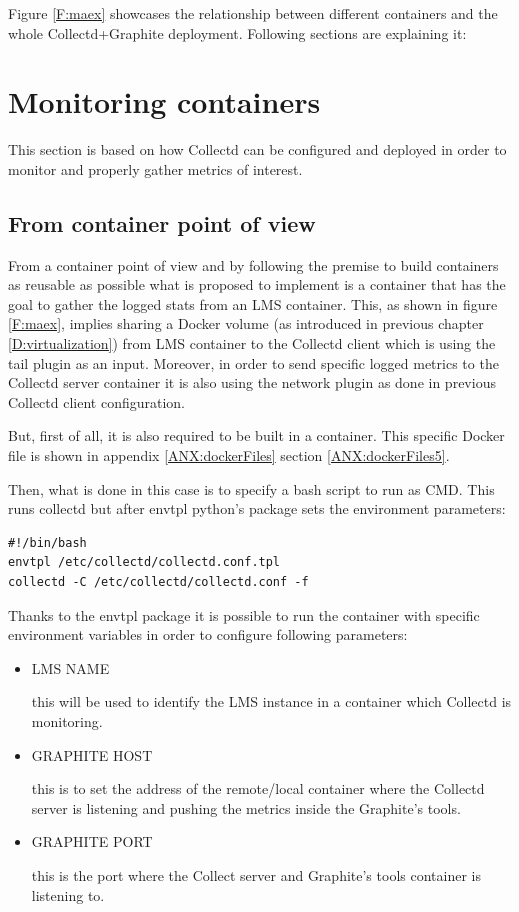 Figure \ref{F:maex} showcases the relationship between different containers and the whole Collectd+Graphite deployment. Following sections are explaining it:

\section{Monitoring containers}

This section is based on how Collectd can be configured and deployed in order to monitor and properly gather metrics of interest.

\subsection{From container point of view}

From a container point of view and by following the premise to build containers as reusable as possible what is proposed to implement is a container that has the goal to gather the logged stats from an LMS container. This, as shown in figure \ref{F:maex}, implies sharing a Docker volume (as introduced in previous chapter \ref{D:virtualization}) from LMS container to the Collectd client which is using the tail plugin as an input. Moreover, in order to send specific logged metrics to the Collectd server container it is also using the network plugin as done in previous Collectd client configuration.

But, first of all, it is also required to be built in a container. This specific Docker file is shown in appendix \ref{ANX:dockerFiles} section \ref{ANX:dockerFiles5}.

Then, what is done in this case is to specify a bash script to run as CMD. This runs collectd but after envtpl python's package sets the environment parameters:
\begin{verbatim}
#!/bin/bash
envtpl /etc/collectd/collectd.conf.tpl
collectd -C /etc/collectd/collectd.conf -f
\end{verbatim}

Thanks to the envtpl package it is possible to run the container with specific environment variables in order to configure following parameters:

\begin{itemize}
\item LMS NAME \hfill

this will be used to identify the LMS instance in a container which Collectd is monitoring.
\item GRAPHITE HOST \hfill

this is to set the address of the remote/local container where the Collectd server is listening and pushing the metrics inside the Graphite's tools.
\item GRAPHITE PORT \hfill

this is the port where the Collect server and Graphite's tools container is listening to.
\end{itemize}

